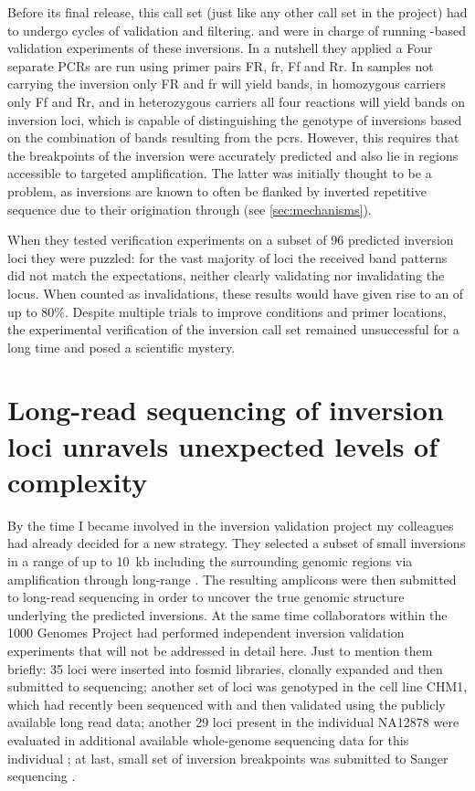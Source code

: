 Before its final release, this call set (just like any other call set in the
project) had to undergo cycles of validation and filtering. \adrian and
\benjamin were in charge of running \pcr-based validation experiments of these
inversions. In a nutshell they applied a 
    { Four separate PCRs
    are run using primer pairs FR, fr, Ff and Rr. In samples
    not carrying the inversion only FR and fr will yield bands,
    in homozygous carriers only Ff and Rr, and in heterozygous
    carriers all four reactions will yield bands}
on inversion loci, which is capable of distinguishing the genotype of inversions
based on the combination of bands resulting from the \acp{pcr}. However,
this requires that the breakpoints of the inversion were accurately predicted
and also lie in regions accessible to targeted \pcr amplification. The latter
was initially thought to be a problem, as inversions are known to often be
flanked by inverted repetitive sequence due to their origination through \nahr
(see \cref{sec:mechanisms}).

When they tested \pcr verification experiments on a subset of 96 predicted
inversion loci they were puzzled: for the vast majority of loci the received
band patterns did not match the expectations, neither clearly validating nor
invalidating the locus. When counted as invalidations, these results would have
given rise to an \fdr of up to 80\%. Despite multiple trials to improve \pcr
conditions and primer locations, the experimental verification of the inversion
call set remained unsuccessful for a long time and posed a scientific mystery.






\section{Long-read sequencing of inversion loci unravels unexpected levels of complexity}
\label{sec:complex_invs_validation}

By the time I became involved in the inversion validation project my colleagues
had already decided for a new strategy. They selected a subset of small
inversions in a range of up to 10~kb including the surrounding genomic regions
via amplification through long-range \pcr. The resulting amplicons were then
submitted to long-read sequencing in order to uncover the true genomic structure
underlying the predicted inversions. At the same time collaborators within the
1000 Genomes Project had performed independent inversion validation experiments
that will not be addressed in detail here. Just to mention them briefly: 35 loci
were inserted into fosmid libraries, clonally expanded and then submitted to
\pacbio sequencing; another set of loci was genotyped in the cell line CHM1,
which had recently been sequenced with \pacbio \citep{Chaisson2014} and then
validated using the publicly available long read data; another 29 loci present
in the individual NA12878 were evaluated in additional available whole-genome
\pacbio sequencing data for this individual \citep{Pendleton2015}; at last, small
set of inversion breakpoints was submitted to Sanger sequencing
\citep[supplementary methods]{Sudmant2015}.


